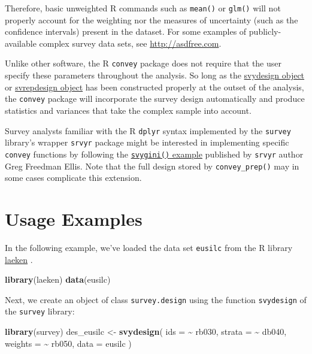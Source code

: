 \documentclass[
]{book}
\newenvironment{Shaded}{\begin{snugshade}}{\end{snugshade}}
\newcommand{\AttributeTok}[1]{\textcolor[rgb]{0.13,0.29,0.53}{#1}}
\newcommand{\FunctionTok}[1]{\textcolor[rgb]{0.13,0.29,0.53}{\textbf{#1}}}
\newcommand{\NormalTok}[1]{#1}
\newcommand{\OtherTok}[1]{\textcolor[rgb]{0.56,0.35,0.01}{#1}}
\newcommand{\SpecialCharTok}[1]{\textcolor[rgb]{0.81,0.36,0.00}{\textbf{#1}}}
\begin{document}
Therefore, basic unweighted R commands such as \texttt{mean()} or \texttt{glm()} will not properly account for the weighting nor the measures of uncertainty (such as the confidence intervals) present in the dataset. For some examples of publicly-available complex survey data sets, see \href{}{http://asdfree.com}.

Unlike other software, the R \texttt{convey} package does not require that the user specify these parameters throughout the analysis. So long as the \href{http://r-survey.r-forge.r-project.org/survey/html/svydesign.html}{svydesign object} or \href{http://r-survey.r-forge.r-project.org/survey/html/svrepdesign.html}{svrepdesign object} has been constructed properly at the outset of the analysis, the \texttt{convey} package will incorporate the survey design automatically and produce statistics and variances that take the complex sample into account.

Survey analysts familiar with the R \texttt{dplyr} syntax implemented by the \texttt{survey} library's wrapper \texttt{srvyr} package might be interested in implementing specific \texttt{convey} functions by following the \href{http://gdfe.co/srvyr/articles/extending-srvyr.html}{\texttt{svygini()} example} published by \texttt{srvyr} author Greg Freedman Ellis. Note that the full design stored by \texttt{convey\_prep()} may in some cases complicate this extension.

\hypertarget{usage-examples}{%
\section{Usage Examples}\label{usage-examples}}

In the following example, we've loaded the data set \texttt{eusilc} from the R library \href{https://CRAN.R-project.org/package=laeken}{laeken} \autocite{R-laeken}.

\begin{Shaded}
\begin{Highlighting}[]
\FunctionTok{library}\NormalTok{(laeken)}
\FunctionTok{data}\NormalTok{(eusilc)}
\end{Highlighting}
\end{Shaded}

Next, we create an object of class \texttt{survey.design} using the function \texttt{svydesign} of the \texttt{survey} library:

\begin{Shaded}
\begin{Highlighting}[]
\FunctionTok{library}\NormalTok{(survey)}
\NormalTok{des\_eusilc }\OtherTok{\textless{}{-}}
  \FunctionTok{svydesign}\NormalTok{(}
    \AttributeTok{ids =} \SpecialCharTok{\textasciitilde{}}\NormalTok{ rb030,}
    \AttributeTok{strata =}  \SpecialCharTok{\textasciitilde{}}\NormalTok{ db040,}
    \AttributeTok{weights =} \SpecialCharTok{\textasciitilde{}}\NormalTok{ rb050,}
    \AttributeTok{data =}\NormalTok{ eusilc}
\NormalTok{  )}
\end{Highlighting}
\end{Shaded}
\end{document}

